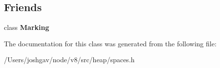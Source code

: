 \subsection*{Friends}
\begin{DoxyCompactItemize}
\item 
class {\bfseries Marking}\hypertarget{classv8_1_1internal_1_1_mark_bit_a59e3efd9691438a0b59a4f16b9aedeba}{}\label{classv8_1_1internal_1_1_mark_bit_a59e3efd9691438a0b59a4f16b9aedeba}

\end{DoxyCompactItemize}


The documentation for this class was generated from the following file\+:\begin{DoxyCompactItemize}
\item 
/\+Users/joshgav/node/v8/src/heap/spaces.\+h\end{DoxyCompactItemize}
